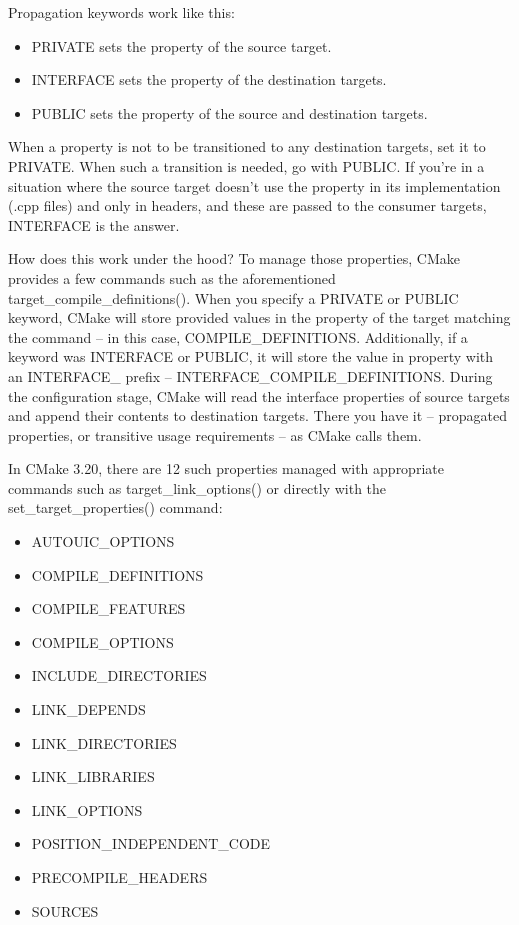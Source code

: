 Propagation keywords work like this:

\begin{itemize}
\item 
PRIVATE sets the property of the source target.

\item 
INTERFACE sets the property of the destination targets.

\item 
PUBLIC sets the property of the source and destination targets.
\end{itemize}

When a property is not to be transitioned to any destination targets, set it to PRIVATE.
When such a transition is needed, go with PUBLIC. If you're in a situation where the source target doesn't use the property in its implementation (.cpp files) and only in headers, and these are passed to the consumer targets, INTERFACE is the answer.

How does this work under the hood? To manage those properties, CMake provides a few commands such as the aforementioned target\_compile\_definitions(). When you specify a PRIVATE or PUBLIC keyword, CMake will store provided values in the property of the target matching the command – in this case, COMPILE\_DEFINITIONS. Additionally, if a keyword was INTERFACE or PUBLIC, it will store the value in property with an INTERFACE\_ prefix – INTERFACE\_COMPILE\_DEFINITIONS. During the configuration stage, CMake will read the interface properties of source targets and append their contents to destination targets. There you have it – propagated properties, or transitive usage requirements – as CMake calls them.

In CMake 3.20, there are 12 such properties managed with appropriate commands such as target\_link\_options() or directly with the set\_target\_properties() command:

\begin{itemize}
\item 
AUTOUIC\_OPTIONS

\item 
COMPILE\_DEFINITIONS

\item 
COMPILE\_FEATURES

\item 
COMPILE\_OPTIONS

\item 
INCLUDE\_DIRECTORIES

\item 
LINK\_DEPENDS

\item 
LINK\_DIRECTORIES

\item 
LINK\_LIBRARIES

\item 
LINK\_OPTIONS

\item 
POSITION\_INDEPENDENT\_CODE

\item 
PRECOMPILE\_HEADERS

\item 
SOURCES
\end{itemize}

